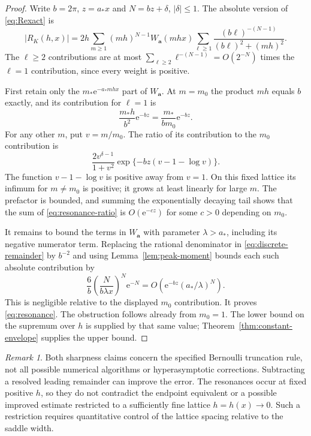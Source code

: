 \documentclass[11pt,a4paper]{article}
\numberwithin{equation}{section}
\theoremstyle{definition}\newtheorem{definition}[theorem]{Definition}
\theoremstyle{remark}\newtheorem{remark}[theorem]{Remark}
\newcommand{\e}{\mathrm e}
\newcommand{\avec}{\boldsymbol a}
\newcommand{\amin}{a_*}
\newcommand{\mmin}{m_*}
\begin{document}
\begin{proof}
Write $b=2\pi$, $z=\amin x$ and $N=bz+\delta$, $|\delta|\le1$.
The absolute version of \eqref{eq:Rexact} is
\begin{equation}
 |R_K(h,x)|=2h\sum_{m\ge1}(mh)^{N-1}W_{\avec}(mhx)
       \sum_{\ell\ge1}\frac{(b\ell)^{-(N-1)}}{(b\ell)^2+(mh)^2}.
 \label{eq:discrete-remainder}
\end{equation}
The $\ell\ge2$ contributions are at most
$\sum_{\ell\ge2}\ell^{-(N-1)}=O(2^{-N})$ times the $\ell=1$
contribution, since every weight is positive.

First retain only the $\mmin\e^{-\amin mhx}$ part of $W_{\avec}$.
At $m=m_0$ the product $mh$ equals $b$ exactly, and its contribution for
$\ell=1$ is
\[
 \frac{\mmin h}{b^2}\e^{-bz}
       =\frac{\mmin}{b m_0}\e^{-bz}.
\]
For any other $m$, put $v=m/m_0$. The ratio of its contribution to the
$m_0$ contribution is
\begin{equation}
 \frac{2v^{\delta-1}}{1+v^2}
       \exp\{-bz(v-1-\log v)\}.
 \label{eq:resonance-ratio}
\end{equation}
The function $v-1-\log v$ is positive away from $v=1$. On this fixed lattice
its infimum for $m\ne m_0$ is positive; it grows at least linearly for large
$m$. The prefactor is bounded, and summing the exponentially decaying tail
shows that the sum of \eqref{eq:resonance-ratio} is $O(\e^{-c z})$ for some
$c>0$ depending on $m_0$.

It remains to bound the terms in $W_{\avec}$ with parameter
$\lambda>\amin$, including its negative numerator term. Replacing the
rational denominator in \eqref{eq:discrete-remainder} by $b^{-2}$ and
using Lemma~\ref{lem:peak-moment} bounds each such absolute contribution by
\[
 \frac{6}{b}\left(\frac{N}{b\lambda x}\right)^N\e^{-N}
       =O\left(\e^{-bz}(\amin/\lambda)^N\right).
\]
This is negligible relative to the displayed $m_0$ contribution. It proves
\eqref{eq:resonance}. The obstruction follows already from $m_0=1$.
The lower bound on the supremum over $h$ is supplied by that same value;
Theorem~\ref{thm:constant-envelope} supplies the upper bound.
\end{proof}

\begin{remark}
Both sharpness claims concern the specified Bernoulli truncation rule, not
all possible numerical algorithms or hyperasymptotic corrections. Subtracting
a resolved leading remainder can improve the error. The resonances occur at
fixed positive $h$, so they do not contradict the endpoint equivalent or a
possible improved estimate restricted to a sufficiently fine lattice
$h=h(x)\to0$. Such a restriction requires quantitative control of the lattice
spacing relative to the saddle width.
\end{remark}
\end{document}
